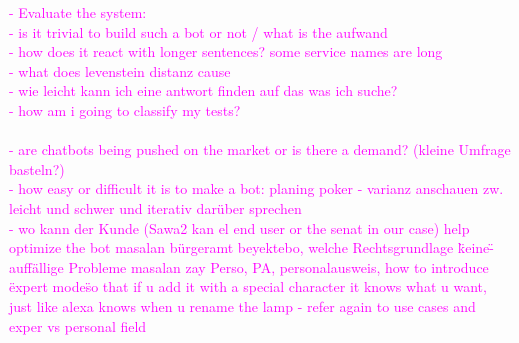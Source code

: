 \textcolor{magenta}{
- Evaluate the system:\\
- is it trivial to build such a bot or not / what is the aufwand\\
- how does it react with longer sentences? some service names are long\\
- what does levenstein distanz cause\\
- wie leicht kann ich eine antwort finden auf das was ich suche?\\
- how am i going to classify my tests?\\
\\
- are chatbots being pushed on the market or is there a demand? (kleine Umfrage basteln?)\\
- how easy or difficult it is to make a bot: planing poker - varianz anschauen zw. leicht und schwer und iterativ darüber sprechen\\
-	wo kann der Kunde (Sawa2 kan el end user or the senat in our case) help optimize the bot
masalan bürgeramt beyektebo, welche Rechtsgrundlage \"keine\"
-	auff\"{a}llige Probleme
masalan zay Perso, PA, personalausweis, how to introduce \"expert mode\" so that if u add it with a special character it knows what u want, just like alexa knows when u rename the lamp - refer again to use cases and exper vs personal field
}

